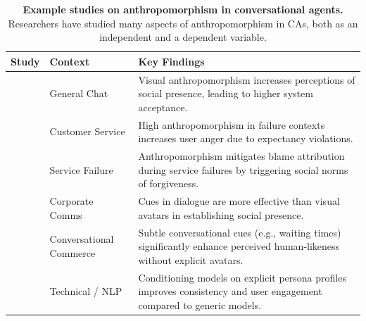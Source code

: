 \documentclass[manuscript,anonymous,sigconf]{acmart}
\begin{document}
\begin{table}[htbp]
    \centering
    \caption{\textbf{Example studies on anthropomorphism in conversational agents.} Researchers have studied many aspects of anthropomorphism in CAs, both as an independent and a dependent variable.}
    \label{tab:lit_summary}
    \renewcommand{\arraystretch}{1.3}
    \footnotesize
    \begin{tabular}{p{} p{} p{}}
        \toprule
        \textbf{Study} & \textbf{Context} & \textbf{Key Findings} \\
        \midrule
        \citet{go2019humanizing} & General Chat & Visual anthropomorphism increases perceptions of social presence, leading to higher system acceptance. \\
        \midrule
        \citet{crolic2022blame} & Customer Service & High anthropomorphism in failure contexts increases user anger due to expectancy violations. \\
        \midrule
        \citet{liu2024exploring} & Service Failure & Anthropomorphism mitigates blame attribution during service failures by triggering social norms of forgiveness. \\
        \midrule
        \citet{araujo2018living} & Corporate Comms & Cues in dialogue are more effective than visual avatars in establishing social presence. \\
        \midrule
        \citet{seeger2021texting} & Conversational Commerce & Subtle conversational cues (e.g., waiting times) significantly enhance perceived human-likeness without explicit avatars. \\
        \midrule
        \citet{zhang2018personalizing} & Technical / NLP & Conditioning models on explicit persona profiles improves consistency and user engagement compared to generic models. \\
        \bottomrule
    \end{tabular}
\end{table}


\end{document}
